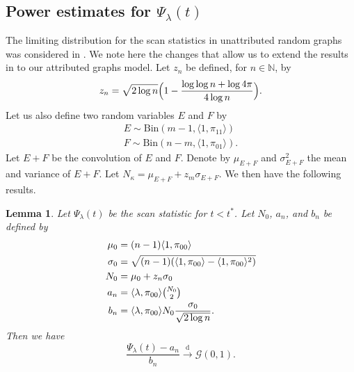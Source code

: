 \documentclass[10pt,draftclsnofoot,onecolumn]{IEEEtran}
\newtheorem{lemma}[theorem]{Lemma}
\theoremstyle{definition}
\begin{document}
\subsection{Power estimates for $\Psi_{\lambda}(t)$}
\label{sec:power-estim-psi_l}
The limiting distribution for the scan statistics in unattributed
random graphs was considered in
\cite{rukhin12}. We note here the changes
that allow us to extend the results in
\cite{rukhin12} to our attributed graphs
model. Let $z_n$ be defined, for $n \in \mathbb{N}$, by
\begin{equation}
  \label{eq:20}
   z_n = \sqrt{2
      \log{n}}\Bigl(1 - \frac{\log{\log{n}} + \log{4 \pi}}{4
      \log{n}}\Bigr).
\end{equation}
Let us also define two random variables $E$ and $F$ by
\begin{gather*}
  E \sim \mathrm{Bin}(m-1, \langle 1, \pi_{11} \rangle) \\ F \sim \mathrm{Bin}(n-m,
  \langle 1, \pi_{01} \rangle).
\end{gather*}%
Let $E + F$ be the convolution of $E$ and $F$. Denote by $\mu_{E+F}$ and
$\sigma_{E+F}^{2}$ the mean and variance of $E + F$. Let
$N_{\kappa} = \mu_{E + F} + z_m \sigma_{E + F}$. We then have the
following results.
\begin{lemma}
  \label{lem:5}
  Let $\Psi_{\lambda}(t)$ be the scan statistic for $t < t^{*}$. Let
  $N_{0}$, $a_n$, and $b_n$ be defined by
\begin{align*}
   \mu_0 &= (n-1) \langle 1, \pi_{00} \rangle \\
   \sigma_0 &= \sqrt{(n-1) (\langle 1, \pi_{00} \rangle - \langle
     1, \pi_{00} \rangle^2)} \\ 
    N_{0} &= \mu_0 + z_n \sigma_0 \\
    a_n &=  \langle \lambda, \pi_{00} \rangle \tbinom{N_{0}}{2} \\ 
   b_n &= \langle \lambda, \pi_{00} \rangle N_{0} \frac{\sigma_0}{\sqrt{2 \log
     n}}.
\end{align*}
Then we have
\begin{equation}
  \frac{\Psi_{\lambda}(t) - a_{n}}{b_n}
  \overset{\mathrm{d}}{\longrightarrow}  \mathcal{G}(0, 1).
\end{equation}
\end{lemma}%
\end{document}
